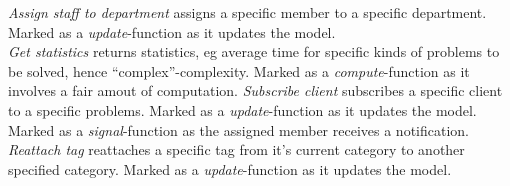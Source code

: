 \emph{Assign staff to department} assigns a specific \astaff[] member to a specific department. Marked as a \textit{update}-function as it updates the model. \\
\emph{Get statistics} returns statistics, eg average time for specific kinds of problems to be solved, hence ``complex''-complexity. Marked as a \textit{compute}-function as it involves a fair amout of computation.
\emph{Subscribe client} subscribes a specific client to a specific problems. Marked as a \textit{update}-function as it updates the model. Marked as a \textit{signal}-function as the assigned \astaff[] member receives a notification. \\
\emph{Reattach tag} reattaches a specific tag from it's current category to another specified category. Marked as a \textit{update}-function as it updates the model.